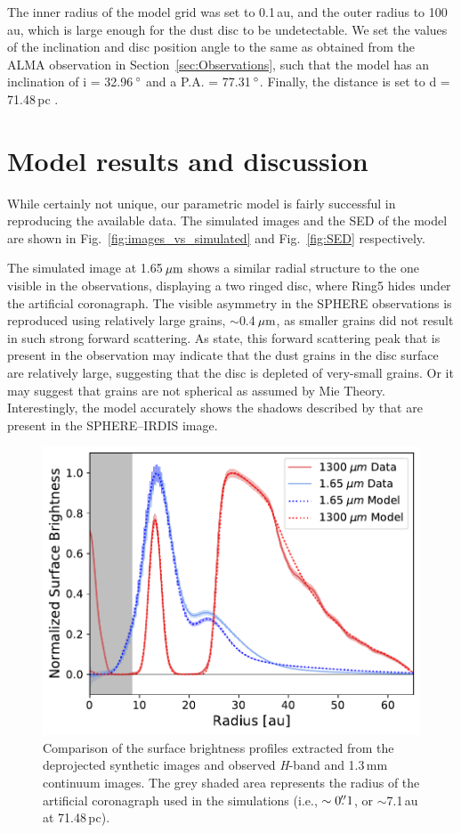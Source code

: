 \documentclass[fleqn,usenatbib,useAMS]{mnras}
\begin{document}
The inner radius of the model grid was set to 0.1\,au, and the outer radius to 100\,au, which is large enough for the dust disc to be undetectable. We set the values of the inclination and disc position angle to the same as obtained from the ALMA observation in Section~\ref{sec:Observations}, such that the model has an inclination of i = 32.96\,$\hbox{$^\circ$}$ and a P.A. = 77.31\,$\hbox{$^\circ$}$. Finally, the distance is set to d = 71.48\,pc \citep{gaiacollaboration2020gaia}.

\section{Model results and discussion} \label{sec:results}

While certainly not unique, our parametric model is fairly successful in reproducing the available data. The simulated images and the SED of the model are shown in Fig.~\ref{fig:images_vs_simulated} and Fig.~\ref{fig:SED} respectively.

The simulated image at 1.65\,$\hbox{$\mu$m}$ shows a similar radial structure to the one visible in the observations, displaying a two ringed disc, where Ring5 hides under the artificial coronagraph. The visible asymmetry in the SPHERE observations is reproduced using relatively large grains, $\sim$0.4\,$\hbox{$\mu$m}$, as smaller grains did not result in such strong forward scattering. As \citet{refId0} state, this forward scattering peak that is present in the observation may indicate that the dust grains in the disc surface are relatively large, suggesting that the disc is depleted of very-small grains. Or it may suggest that grains are not spherical as assumed by Mie Theory. Interestingly, the model accurately shows the shadows described by \citet{dOrazi} that are present in the SPHERE--IRDIS image.  

\begin{figure}
	\includegraphics[width=\columnwidth]{comp_fig_all_profiles_au.pdf}
    \caption{Comparison of the surface brightness profiles extracted from the deprojected synthetic images and observed \textit{H}-band and 1.3\,mm continuum images. The grey shaded area represents the radius of the artificial coronagraph used in the simulations (i.e., $\sim0\hbox{$.\!\!^{\prime\prime}$} 1$, or $\sim$7.1\,au at 71.48\,pc).}
    \label{fig:radprofiles}
\end{figure}
\end{document}
